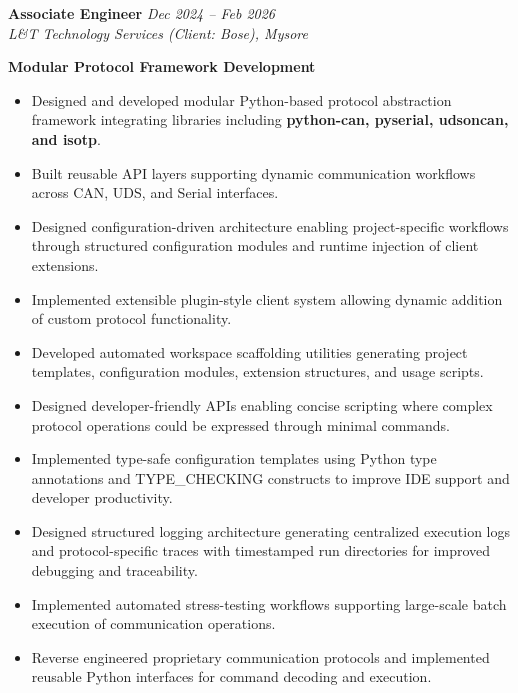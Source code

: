 \documentclass[a4paper,10pt]{article}
\begin{document}
\textbf{Associate Engineer} \hfill \textit{Dec 2024 -- Feb 2026} \\
\textit{L\&T Technology Services (Client: Bose), Mysore}

\textbf{Modular Protocol Framework Development}

\begin{itemize}

\item Designed and developed modular Python-based protocol abstraction framework integrating libraries including \textbf{python-can, pyserial, udsoncan, and isotp}.

\item Built reusable API layers supporting dynamic communication workflows across CAN, UDS, and Serial interfaces.

\item Designed configuration-driven architecture enabling project-specific workflows through structured configuration modules and runtime injection of client extensions.

\item Implemented extensible plugin-style client system allowing dynamic addition of custom protocol functionality.

\item Developed automated workspace scaffolding utilities generating project templates, configuration modules, extension structures, and usage scripts.

\item Designed developer-friendly APIs enabling concise scripting where complex protocol operations could be expressed through minimal commands.

\item Implemented type-safe configuration templates using Python type annotations and TYPE\_CHECKING constructs to improve IDE support and developer productivity.

\item Designed structured logging architecture generating centralized execution logs and protocol-specific traces with timestamped run directories for improved debugging and traceability.

\item Implemented automated stress-testing workflows supporting large-scale batch execution of communication operations.

\item Reverse engineered proprietary communication protocols and implemented reusable Python interfaces for command decoding and execution.

\end{itemize}
\end{document}
